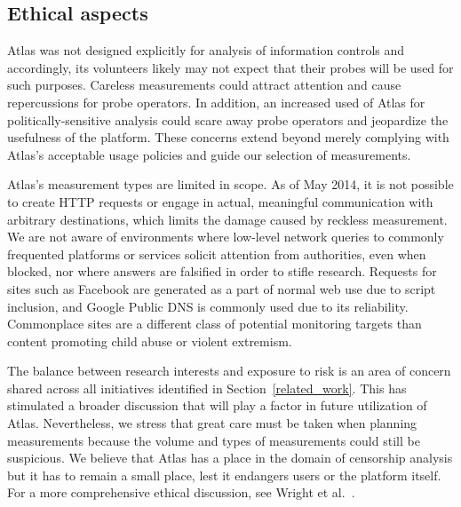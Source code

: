 \subsection{Ethical aspects}

Atlas was not designed explicitly for analysis of information controls
and accordingly, its volunteers likely may not expect that their probes
will be used for such purposes.  Careless measurements could attract
attention and cause repercussions for probe operators.  In addition, an
increased used of Atlas for politically-sensitive analysis could scare
away probe operators and jeopardize the usefulness of the platform.
These concerns extend beyond merely complying with Atlas's acceptable
usage policies and guide our selection of measurements.

Atlas's measurement types are limited in scope.  As of May 2014, it is
not possible to create HTTP requests or engage in actual, meaningful
communication with arbitrary destinations, which limits the damage
caused by reckless measurement. We are not aware of environments where
low-level network queries to commonly frequented platforms or services
solicit attention from authorities, even when blocked, nor where answers
are falsified in order to stifle research. Requests for sites such as
Facebook are generated as a part of normal web use due to script
inclusion, and Google Public DNS is commonly used due to its
reliability. Commonplace sites are a different class of potential
monitoring targets than content promoting child abuse or violent
extremism.

The balance between research interests and exposure to risk is an area
of concern shared across all initiatives identified in
Section~\ref{related_work}. This has stimulated a broader discussion
that will play a factor in future utilization of Atlas. Nevertheless, we
stress that great care must be taken when planning measurements because
the volume and types of measurements could still be suspicious. We
believe that Atlas has a place in the domain of censorship analysis but
it has to remain a small place, lest it endangers users or the platform
itself. For a more comprehensive ethical discussion, see Wright et
al.~\cite[\S~5]{Wright2011}.
